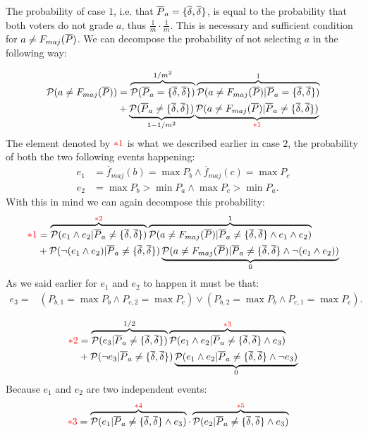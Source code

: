 \documentclass[version=3.21, pagesize, twoside=off, bibliography=totoc, DIV=calc, fontsize=12pt, a4paper]{scrartcl}
\begin{document}
The probability of case $1$, i.e. that $\overline{P}_a=\{\overline{\delta},\overline{\delta}\}$, is equal to the probability that both voters do not grade $a$, thus $\frac{1}{m}\cdot\frac{1}{m}$. This is necessary and sufficient condition for $a\neq F_{maj}(\overline{P})$. We can decompose the probability of not selecting $a$ in the following way:

\begin{align}
	\mathcal{P}(a\neq F_{maj}(\overline{P})) &=\overbrace{\mathcal{P}(\overline{P}_a=\{\overline{\delta},\overline{\delta}\})}^{1/m^2} \overbrace{\mathcal{P}(a\neq F_{maj}(\overline{P})|\overline{P}_a=\{\overline{\delta},\overline{\delta}\})}^{1}\\
	&+\underbrace{\mathcal{P}(\overline{P}_a\neq\{\overline{\delta},\overline{\delta}\})}_{1-1/m^2} \underbrace{\mathcal{P}(a\neq F_{maj}(\overline{P})|\overline{P}_a\neq\{\overline{\delta},\overline{\delta}\})}_{\color{red}*1}
\end{align}
The element denoted by ${\color{red}*1}$ is what we described earlier in case $2$, the probability of both the two following events happening:
\begin{align}
	e_1 &= \overline{f}_{maj}(b)=\max{P_{b}} \wedge \overline{f}_{maj}(c)=\max{P_{c}}\\
	e_2 &= \max{P_{b}}>\min{P_{a}} \wedge \max{P_{c}}>\min{P_{a}}.
\end{align}	
With this in mind we can again decompose this probability:
\begin{align}
	{\color{red}*1} &=\overbrace{\mathcal{P}(e_1 \wedge e_2 |\overline{P}_a\neq\{\overline{\delta},\overline{\delta}\}) }^{{\color{red}*2}} \overbrace{\mathcal{P}(a\neq F_{maj}(\overline{P})|\overline{P}_a\neq\{\overline{\delta},\overline{\delta}\}\wedge e_1 \wedge e_2)}^{1}\\
	&+\mathcal{P}(\lnot(e_1 \wedge e_2) |\overline{P}_a\neq\{\overline{\delta},\overline{\delta}\}) \underbrace{\mathcal{P}(a\neq F_{maj}(\overline{P})|\overline{P}_a\neq\{\overline{\delta},\overline{\delta}\}\wedge \lnot (e_1 \wedge e_2))}_{0}
\end{align}
As we said earlier for $e_1$ and $e_2$ to happen it must be that:
\begin{align}
	e_3 = &(P_{b,1} = \max{P_{b}} \wedge P_{c,2} = \max{P_{c}}) \vee (P_{b,2} = \max{P_{b}} \wedge P_{c,1} = \max{P_{c}}) .
\end{align}	

\begin{align}
	{\color{red}*2} &=\overbrace{\mathcal{P}(e_3 |\overline{P}_a\neq\{\overline{\delta},\overline{\delta}\}) }^{1/2} \overbrace{\mathcal{P}(e_1 \wedge e_2|\overline{P}_a\neq\{\overline{\delta},\overline{\delta}\}\wedge e_3)}^{{\color{red}*3}}\\
	&+\mathcal{P}(\lnot e_3 |\overline{P}_a\neq\{\overline{\delta},\overline{\delta}\}) \underbrace{\mathcal{P}(e_1 \wedge e_2|\overline{P}_a\neq\{\overline{\delta},\overline{\delta}\}\wedge \lnot e_3)}_{0}
\end{align}
Because $e_1$ and $e_2$ are two independent events:
\begin{align}
	{\color{red}*3} &=\overbrace{\mathcal{P}(e_1 |\overline{P}_a\neq\{\overline{\delta},\overline{\delta}\}\wedge e_3)}^{{\color{red}*4}} \cdot \overbrace{\mathcal{P}(e_2 |\overline{P}_a\neq\{\overline{\delta},\overline{\delta}\}\wedge e_3)}^{{\color{red}*5}}
\end{align}
\end{document}
